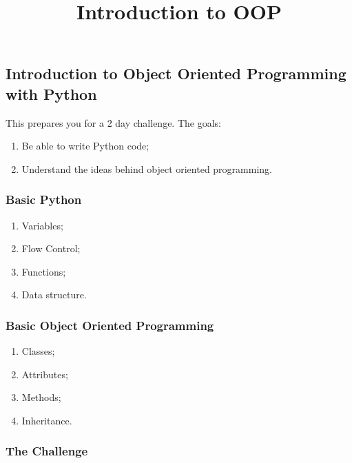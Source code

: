 \documentclass[11pt]{article}
\title{Introduction to OOP}
\providecommand{\tightlist}{%
      \setlength{\itemsep}{0pt}\setlength{\parskip}{0pt}}
\begin{document}
    
    
    \maketitle
    
    

    
    \subsection{Introduction to Object Oriented Programming with
Python}\label{introduction-to-object-oriented-programming-with-python}

This prepares you for a 2 day challenge. The goals:

\begin{enumerate}
\def\labelenumi{\arabic{enumi}.}
\tightlist
\item
  Be able to write Python code;
\item
  Understand the ideas behind object oriented programming.
\end{enumerate}

\subsubsection{Basic Python}\label{basic-python}

\begin{enumerate}
\def\labelenumi{\arabic{enumi}.}
\tightlist
\item
  Variables;
\item
  Flow Control;
\item
  Functions;
\item
  Data structure.
\end{enumerate}

\subsubsection{Basic Object Oriented
Programming}\label{basic-object-oriented-programming}

\begin{enumerate}
\def\labelenumi{\arabic{enumi}.}
\tightlist
\item
  Classes;
\item
  Attributes;
\item
  Methods;
\item
  Inheritance.
\end{enumerate}

\subsubsection{The Challenge}\label{the-challenge}
\end{document}
